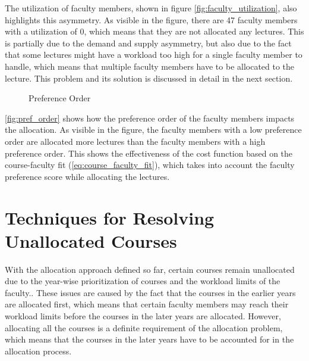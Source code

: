 The utilization of faculty members, shown in figure \autoref{fig:faculty_utilization}, also highlights this asymmetry. As visible in the figure, there are 47 faculty members with a utilization of 0, which means that they are not allocated any lectures. This is partially due to the demand and supply asymmetry, but also due to the fact that some lectures might have a workload too high for a single faculty member to handle, which means that multiple faculty members have to be allocated to the lecture. This problem and its solution is discussed in detail in the next section.

\begin{figure}[H]
  \centering
  \caption{Preference Order}
  \label{fig:pref_order}
\end{figure}

\autoref{fig:pref_order} shows how the preference order of the faculty members impacts the allocation. As visible in the figure, the faculty members with a low preference order are allocated more lectures than the faculty members with a high preference order. This shows the effectiveness of the cost function based on the course-faculty fit (\autoref{eq:course_faculty_fit}), which takes into account the faculty preference score while allocating the lectures.

\section{Techniques for Resolving Unallocated Courses}
\label{sec:rectifying_unallocated_courses}

With the allocation approach defined so far, certain courses remain unallocated due to the year-wise prioritization of courses and the workload limits of the faculty.. These issues are caused by the fact that the courses in the earlier years are allocated first, which means that certain faculty members may reach their workload limits before the courses in the later years are allocated. However, allocating all the courses is a definite requirement of the allocation problem, which means that the courses in the later years have to be accounted for in the allocation process.

